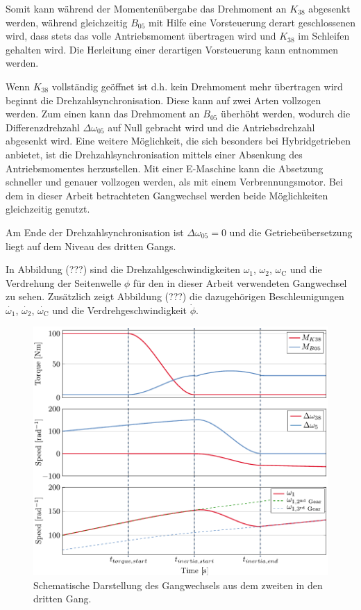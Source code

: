 Somit kann während der Momentenübergabe das Drehmoment an $K_\mathrm{38}$ abgesenkt werden, während gleichzeitig $B_\mathrm{05}$ mit Hilfe eine Vorsteuerung derart geschlossenen wird, dass stets das volle Antriebsmoment übertragen wird und $K_\mathrm{38}$ im Schleifen gehalten wird. Die Herleitung einer derartigen Vorsteuerung kann \cite{Weber.2018} entnommen werden.    
  
Wenn $K_\mathrm{38}$ vollständig geöffnet ist d.h. kein Drehmoment mehr übertragen wird beginnt die Drehzahlsynchronisation. Diese kann auf zwei Arten vollzogen werden. Zum einen kann das Drehmoment an $B_\mathrm{05}$ überhöht werden, wodurch die Differenzdrehzahl $\Delta \omega_{05}$ auf Null gebracht wird und die Antriebsdrehzahl abgesenkt wird. Eine weitere Möglichkeit, die sich besonders bei Hybridgetrieben anbietet, ist die Drehzahlsynchronisation mittels einer Absenkung des Antriebsmomentes herzustellen. Mit einer E-Maschine kann die Absetzung schneller und genauer vollzogen werden, als mit einem Verbrennungsmotor. Bei dem in dieser Arbeit betrachteten Gangwechsel werden beide Möglichkeiten gleichzeitig genutzt.

Am Ende der Drehzahlsynchronisation ist $\Delta \omega_{05}=0$ und die Getriebeübersetzung liegt auf dem Niveau des dritten Gangs.

In Abbildung (???) sind die Drehzahlgeschwindigkeiten $\omega_1$, $\omega_2$, $\omega_\mathrm{C}$ und die Verdrehung der Seitenwelle $\phi$ für den in dieser Arbeit verwendeten Gangwechsel zu sehen. Zusätzlich zeigt Abbildung (???) die dazugehörigen Beschleunigungen $\dot{\omega_1}$, $\dot{\omega_2}$, $\dot{\omega_\mathrm{C}}$ und die Verdrehgeschwindigkeit $\dot{\phi}$.

\begin{figure}[t]
	\centering 
	\includegraphics[scale=1]{figures/03_Sensitivitaetsanalyse/01_Gangwechsel/23Shift}
	\caption{Schematische Darstellung des Gangwechsels aus dem zweiten in den dritten Gang.}
	\label{fig:23zughoch_schema} %
\end{figure}

